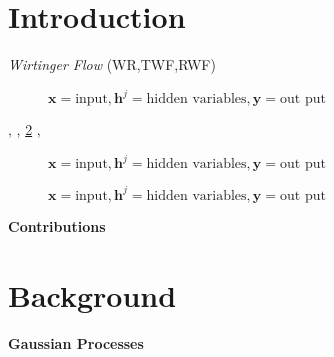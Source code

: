 \documentclass{article}
\title{\papertitle}
\author{\authorinfo}
\begin{document}
\maketitle

\begin{abstract}
\end{abstract}

\section{Introduction}
\label{sec:intro}
 \emph{Wirtinger Flow}
(\eg WR,TWF,RWF)
   \begin{figure}
     \centering
    \resizebox{0.7\textwidth}{!}{}
     \caption{$\boldsymbol{x} =\text{input},\boldsymbol{h}^j=\text{hidden variables},\boldsymbol{y}=\text{out
    put}$}
     \label{fig:tikz_test}
   \end{figure}
\citep[e.g.][]{Wirtinger1927},
\citep{Wirtinger1927},
\cite[\eg variance starvation of RFF,][]{Wirtinger1927}
\cref{fig:tikz_test}
,
\cite{Wirtinger1927}
\citet{Wirtinger1927} 
   \begin{figure}
     \centering
    \resizebox{0.7\textwidth}{!}{}
     \caption{$\boldsymbol{x} =\text{input},\boldsymbol{h}^j=\text{hidden variables},\boldsymbol{y}=\text{out
    put}$}
     \label{fig:tikz_test}
   \end{figure}
      \begin{figure}
     \centering
    \resizebox{0.7\textwidth}{!}{}
     \caption{$\boldsymbol{x} =\text{input},\boldsymbol{h}^j=\text{hidden variables},\boldsymbol{y}=\text{out
    put}$}
     \label{fig:tikz_test_2}
   \end{figure}

\textbf{Contributions}\quad



\section{Background}
\label{sec:background}


\paragraph{Gaussian Processes}
\end{document}
